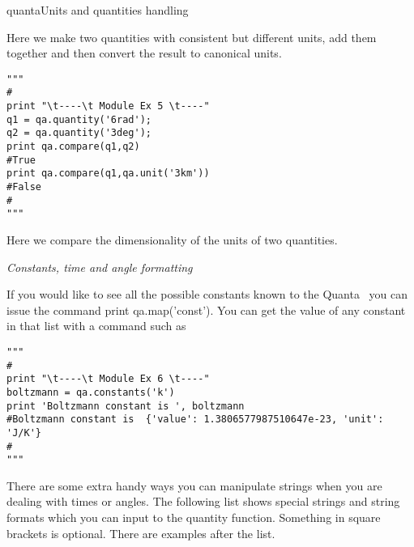 \begin{ahmodule}{quanta}{Units and quantities handling}
\begin{ahdescription}
\begin{ahexample}
Here we make two quantities with consistent but different units,
add them together and then convert the result to canonical units.

\end{ahexample} 


\begin{ahexample}
\begin{verbatim}
"""
#
print "\t----\t Module Ex 5 \t----"
q1 = qa.quantity('6rad');
q2 = qa.quantity('3deg');
print qa.compare(q1,q2)
#True
print qa.compare(q1,qa.unit('3km'))
#False
#
"""
\end{verbatim} 

Here we compare the dimensionality of the units of two
quantities.


\end{ahexample} 




\bigskip
{\it Constants, time and angle formatting}

If you would like to see all the possible constants known to the Quanta
\tool\ you can issue the command {\cf print qa.map('const')}.  You can get the
value of any constant in that list with a command such as

\begin{verbatim}
"""
#
print "\t----\t Module Ex 6 \t----"
boltzmann = qa.constants('k')
print 'Boltzmann constant is ', boltzmann
#Boltzmann constant is  {'value': 1.3806577987510647e-23, 'unit': 'J/K'}
#
"""
\end{verbatim}


There are some extra handy ways you can manipulate strings when you are
dealing with times or angles.  The following list shows special strings
and string formats which you can input to the {\stff quantity} function. 
Something in square brackets is optional.  There are examples after the
list. 


\end{ahdescription}
\end{ahmodule}
